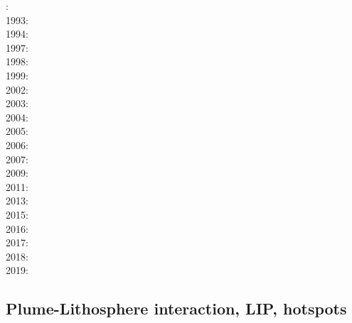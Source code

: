 {\scriptsize
{}: \cite{kell91}\\
1993: \cite{keki93}\\
1994: \cite{nasf94}\cite{fari94}\cite{leka94b}\cite{hayu94}\\
1997: \cite{vank97}\cite{keki97}\cite{laym97}\\
1998: \cite{thta98}\cite{stoc98}\\
1999: \cite{lays99}\\
2002: \cite{falt02}\cite{dagl02}\cite{nitg02}\cite{tagh02}\\
2003: \cite{safa03}\\
2004: \cite{goch04}\cite{scmo04}\\
2005: \cite{tagu05}\cite{bung05}\\
2006: \cite{isst06}\cite{liva06a}\cite{liva06b}\cite{zhon06}\cite{mita06}\cite{nokm06}\cite{qufo06}
      \cite{keso06}\\
2007: \cite{yumh07}\\
2009: \cite{vavl09}\cite{bogj09}\cite{faho09}\cite{scbs09b}\\
2011: \cite{toyu11}\cite{talz11}\cite{burk11}\cite{memm11}\cite{dalt11}\cite{tree11}\\
2013: \cite{dagm13}\cite{madd13}\cite{ande13}\cite{vadv13}\\
2015: \cite{daso15}\cite{hafg15}\\
2016: \cite{kili16}\\
2017: \cite{zhli17}\cite{moyu17}\cite{lizh17}\\
2018: \cite{dacc18}\cite{trev18}\\
2019: \cite{argc19}
}

\subsection{Plume-Lithosphere interaction, LIP, hotspots}

